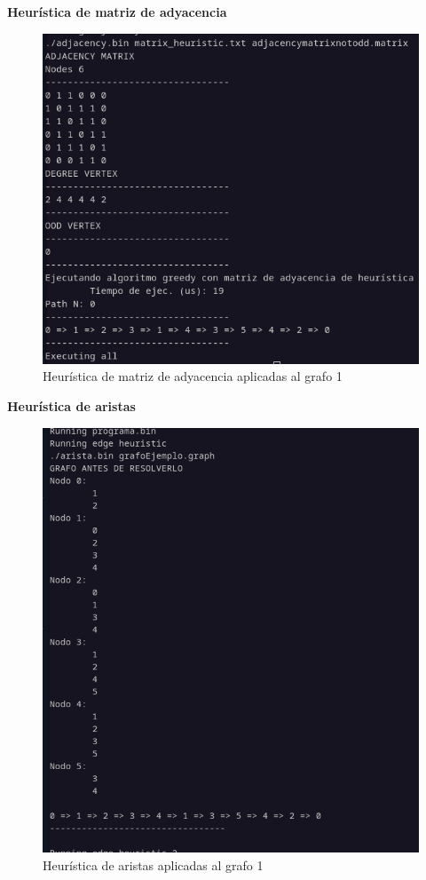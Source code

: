 \textbf{Heurística de matriz de adyacencia}

\begin{figure}[H]
	\centering
	\includegraphics[scale=0.40]{adjacency1}
	\caption{Heurística de matriz de adyacencia aplicadas al grafo 1}
\end{figure}

\textbf{Heurística de aristas }

\begin{figure}[H]
	\centering
	\includegraphics[scale=0.40]{edge1}
	\caption{Heurística de aristas aplicadas al grafo 1}
\end{figure}

